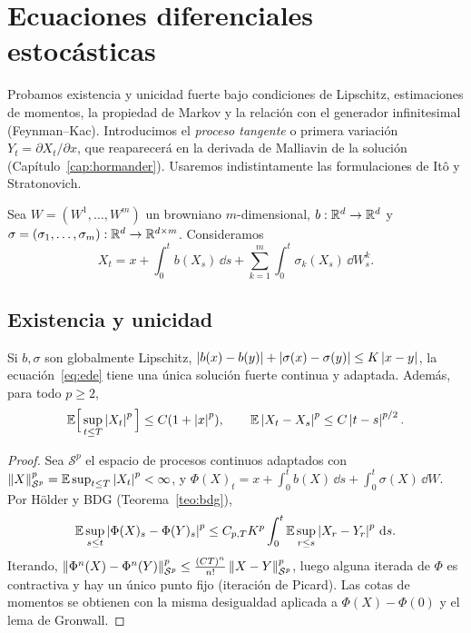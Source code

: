 \chapter{Ecuaciones diferenciales estocásticas}\label{cap:ede}

\begin{panorama}
Probamos existencia y unicidad fuerte bajo condiciones de Lipschitz, estimaciones de
momentos, la propiedad de Markov y la relación con el generador infinitesimal (Feynman--Kac).
Introducimos el \emph{proceso tangente} o primera variación $Y_t=\partial X_t/\partial x$, que reaparecerá
en la derivada de Malliavin de la solución (Capítulo~\ref{cap:hormander}). Usaremos indistintamente las
formulaciones de Itô y Stratonovich.
\end{panorama}

Sea $W=(W^1,\dots,W^m)$ un browniano $m$-dimensional, $b:\mathbb{R}^d\to\mathbb{R}^d$ y $\sigma=(\sigma_1,\dots,\sigma_m):
\mathbb{R}^d\to\mathbb{R}^{d\times m}$. Consideramos
\begin{equation}\label{eq:ede}
  X_t=x+\int_0^tb(X_s)\,\dd s+\sum_{k=1}^m\int_0^t\sigma_k(X_s)\,\dd W^k_s.
\end{equation}

\section{Existencia y unicidad}

\begin{teorema}\label{teo:existencia-ede}
Si $b,\sigma$ son globalmente Lipschitz, $\left\lvert b(x)-b(y)\right\rvert+\left\lvert \sigma(x)-\sigma(y)\right\rvert\le K\left\lvert x-y\right\rvert$,
la ecuación~\eqref{eq:ede} tiene una única solución fuerte continua y adaptada. Además, para todo
$p\ge2$,
\[
  \mathbb{E}\Big[\sup_{t\le T}\left\lvert X_t\right\rvert^p\Big]\le C(1+\left\lvert x\right\rvert^p),\qquad\mathbb{E}\left\lvert X_t-X_s\right\rvert^p\le C\left\lvert t-s\right\rvert^{p/2}.
\]
\end{teorema}

\begin{proof}
Sea $\mathcal S^p$ el espacio de procesos continuos adaptados con $\left\lVert X\right\rVert_{\mathcal S^p}^p=\mathbb{E}\sup_{t\le T}\left\lvert X_t\right\rvert^p<
\infty$, y $\Phi(X)_t=x+\int_0^tb(X)\,\dd s+\int_0^t\sigma(X)\,\dd W$. Por Hölder y BDG (Teorema~\ref{teo:bdg}),
\[
  \mathbb{E}\sup_{s\le t}\left\lvert \Phi(X)_s-\Phi(Y)_s\right\rvert^p\le C_{p,T}K^p\int_0^t\mathbb{E}\sup_{r\le s}\left\lvert X_r-Y_r\right\rvert^p\,\mathrm{d} s.
\]
Iterando, $\left\lVert \Phi^n(X)-\Phi^n(Y)\right\rVert_{\mathcal S^p}^p\le\frac{(CT)^n}{n!}\left\lVert X-Y\right\rVert_{\mathcal S^p}^p$, luego alguna iterada de $\Phi$ es contractiva y
hay un único punto fijo (iteración de Picard). Las cotas de momentos se obtienen con la misma
desigualdad aplicada a $\Phi(X)-\Phi(0)$ y el lema de Gronwall.
\end{proof}

